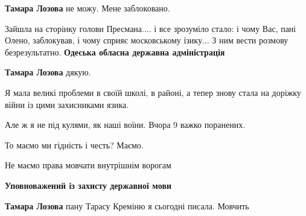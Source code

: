 \begin{itemize}
\begin{itemize}
\textbf{Тамара Лозова} не можу. Мене заблоковано.
\end{itemize}

 

Зайшла на сторінку голови Пресмана.... і все зрозуміло стало: і чому Вас, пані
Олено, заблокував, і чому сприяє московському ізику... З ним вести розмову
безрезультатно. \textbf{Одеська обласна державна адміністрація}

\begin{itemize}
 
\textbf{Тамара Лозова} дякую.

Я мала великі проблеми в своїй школі, в районі, а тепер знову стала на доріжку
війни із цими захисниками язика.

Але ж я не під кулями, як наші воїни. Вчора 9 важко поранених.

То маємо ми гідність і честь? Маємо.

Не маємо права мовчати внутрішнім ворогам
\end{itemize}

 
\textbf{Уповноважений із захисту державної мови}

\begin{itemize}
 
\textbf{Тамара Лозова} пану Тарасу Креміню я сьогодні писала. Мовчить

 

\end{itemize}
\end{itemize}
